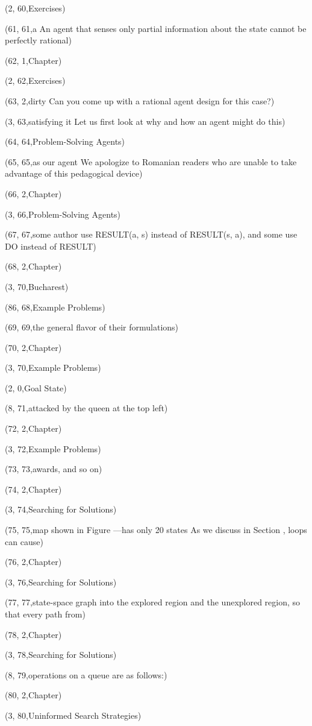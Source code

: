 (2, 60,Exercises)

(61, 61,a An agent that senses only partial information about the state cannot be perfectly rational)

(62, 1,Chapter)

(2, 62,Exercises)

(63, 2,dirty Can you come up with a rational agent design for this case?)

(3, 63,satisfying it Let us ﬁrst look at why and how an agent might do this)

(64, 64,Problem-Solving Agents)

(65, 65,as our agent We apologize to Romanian readers who are unable to take advantage of this pedagogical device)

(66, 2,Chapter)

(3, 66,Problem-Solving Agents)

(67, 67,some author use RESULT(a, s) instead of RESULT(s, a), and some use DO instead of RESULT)

(68, 2,Chapter)

(3, 70,Bucharest)

(86, 68,Example Problems)

(69, 69,the general ﬂavor of their formulations)

(70, 2,Chapter)

(3, 70,Example Problems)

(2, 0,Goal State)

(8, 71,attacked by the queen at the top left)

(72, 2,Chapter)

(3, 72,Example Problems)

(73, 73,awards, and so on)

(74, 2,Chapter)

(3, 74,Searching for Solutions)

(75, 75,map shown in Figure —has only 20 states As we discuss in Section , loops can cause)

(76, 2,Chapter)

(3, 76,Searching for Solutions)

(77, 77,state-space graph into the explored region and the unexplored region, so that every path from)

(78, 2,Chapter)

(3, 78,Searching for Solutions)

(8, 79,operations on a queue are as follows:)

(80, 2,Chapter)

(3, 80,Uninformed Search Strategies)

